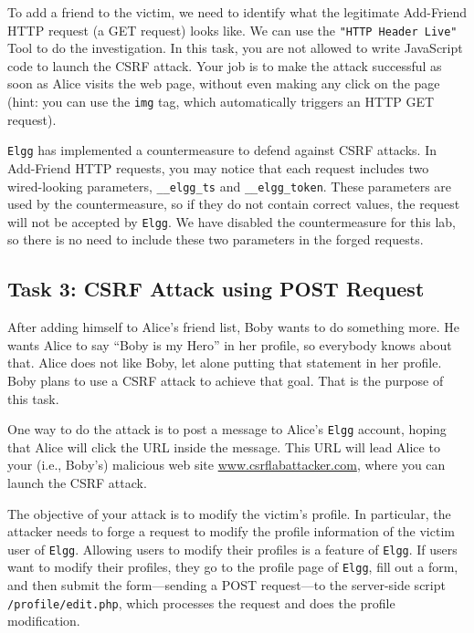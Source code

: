 To add a friend to the victim, we need to identify what the legitimate 
Add-Friend HTTP request (a GET request) looks like. We can use 
the \texttt{"HTTP Header Live"} Tool to do the investigation. 
In this task, you are not allowed to
write JavaScript code to launch the CSRF attack. Your job is to make the
attack successful as soon as Alice visits the web page, without even making
any click on the page (hint: you can use the {\tt img} tag, which
automatically triggers an HTTP GET request).
 

\texttt{Elgg} has implemented a countermeasure to defend against 
CSRF attacks. In Add-Friend HTTP requests, you may notice that each 
request includes two wired-looking parameters, \texttt{\_\_elgg\_ts} and 
\texttt{\_\_elgg\_token}. These parameters are used by the countermeasure, so if they do not
contain correct values, the request will not be accepted by \texttt{Elgg}.   
We have disabled the countermeasure for this lab, so there is no need to include these two 
parameters in the forged requests. 


\subsection{Task 3: CSRF Attack using POST Request}

After adding himself to Alice's friend list, Boby wants to do something more. He 
wants Alice to say ``Boby is my Hero'' in her profile, so everybody knows 
about that. Alice does not like Boby, let alone putting that statement 
in her profile. Boby plans to use a CSRF attack to achieve that goal. 
That is the purpose of this task. 


One way to do the attack is to post a message to Alice's {\tt Elgg} account, hoping that 
Alice will click the URL inside the message. This URL will lead Alice to your (i.e., Boby's)
malicious web site \url{www.csrflabattacker.com}, where you can launch the
CSRF attack. 

The objective of your attack is to modify the victim's profile. 
In particular, the attacker needs to forge a request 
to modify the profile information of the victim user of {\tt Elgg}. 
Allowing users to modify their profiles is a feature of 
{\tt Elgg}. If  users want to modify their profiles,
they go to the profile page of {\tt Elgg}, fill out 
a form, and then submit the form---sending a POST request---to 
the server-side script {\tt /profile/edit.php}, which 
processes the request and does the profile modification.


